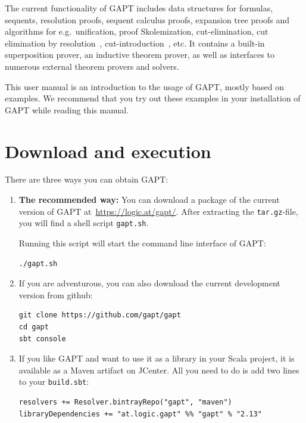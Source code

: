 \documentclass[a4paper,11pt]{book}
\begin{document}
The current functionality of GAPT includes data structures for formulas,
sequents, resolution proofs, sequent calculus proofs, expansion tree proofs and
algorithms for e.g.\ unification, proof Skolemization, cut-elimination, cut
elimination by resolution~\cite{Baaz00CutElimination},
cut-introduction~\cite{Hetzl2012}, etc. It contains a built-in superposition
prover, an inductive theorem prover, as well as interfaces to numerous external
theorem provers and solvers.

This user manual is an introduction to the usage of GAPT, mostly based on examples.
We recommend that you try out these examples in your installation of GAPT while
reading this manual.

\chapter{Download and execution}

There are three ways you can obtain GAPT:

\begin{enumerate}

\item {\bfseries The recommended way:}  You can download a package of the current
version of GAPT at~\url{https://logic.at/gapt/}.  After extracting
the \texttt{tar.gz}-file, you will find a shell script \texttt{gapt.sh}.

Running this script will start the command line interface of GAPT:
\begin{lstlisting}
./gapt.sh
\end{lstlisting}

\item If you are adventurous, you can also download the current development
  version from github:
\begin{lstlisting}
git clone https://github.com/gapt/gapt
cd gapt
sbt console
\end{lstlisting}

\item If you like GAPT and want to use it as a library in your Scala project,
  it is available as a Maven artifact on JCenter.  All you need to do is add
  two lines to your \verb,build.sbt,:
\begin{lstlisting}
resolvers += Resolver.bintrayRepo("gapt", "maven")
libraryDependencies += "at.logic.gapt" %% "gapt" % "2.13"
\end{lstlisting}

\end{enumerate}
\end{document}
